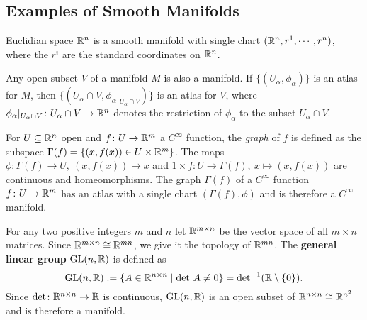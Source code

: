 \subsection{Examples of Smooth Manifolds}
\begin{example}
    Euclidian space $\mathbb{R}^n $ is a smooth manifold with single chart $(\mathbb{R}^n , r^1,\cdots , r^n )$, where the $r^i $ are the standard coordinates on $\mathbb{R}^n $.
\end{example}
\begin{example}
    Any open subset $V$ of a manifold $M$ is also a manifold. If $\{(U_{\alpha }, \phi _{\alpha })\} $ is an atlas for $M$, then $\{(U_{\alpha }\cap V, \phi _{\alpha }| _{U_{\alpha }\cap V})\} $ is an atlas for $V$, where $\phi _{\alpha }| _{U_{\alpha }\cap V} \colon U_{\alpha }\cap V \to \mathbb{R}^n $ denotes the restriction of $\phi _{\alpha }$ to the subset $U_{\alpha }\cap V$. 
\end{example}
\begin{example}
    For $U\subseteq \mathbb{R}^n $ open and $f \colon U \to \mathbb{R}^m$ a $C^{\infty}$ function, the \emph{graph} of $f$ is defined as the subspace $\Gamma(f)= \{(x, f(x)) \in  U \times  \mathbb{R}^m\} $. The maps $\phi \colon  \Gamma(f) \to U, \ (x, f(x) ) \mapsto  x$ and $1 \times f \colon U \to \Gamma(f), \ x \mapsto  (x, f(x))$ are continuous and homeomorphisms. The graph $\Gamma(f)$ of a $C^{\infty}$ function $f \colon U \to \mathbb{R}^m$ has an atlas with a single chart $(\Gamma(f), \phi)$ and is therefore a $C^{\infty}$ manifold.
\end{example}
\begin{example}
    For any two positive integers $m$ and $n$ let $\mathbb{R} ^{ m \times n}$ be the vector space of all $m \times n$ matrices. Since $\mathbb{R} ^{ m\times n}\cong \mathbb{R}^{mn}$, we give it the topology of $\mathbb{R}^{mn}$. The \textbf{general linear group} $\operatorname{GL}(n, \mathbb{R})$ is defined as \[
        \operatorname{GL}(n,\mathbb{R}) := \{A \in \mathbb{R}^{n \times n} \mid \det \, A \neq 0\} = {\det} ^{-1}  (\mathbb{R} \setminus \{0\} ).
    \] Since $\det \colon \mathbb{R}^{n \times n} \to \mathbb{R}$ is continuous, $\operatorname{GL}(n, \mathbb{R})$ is an open subset of $\mathbb{R}^{n \times n}\cong \mathbb{R}^{n^2}$ and is therefore a manifold.
\end{example}

